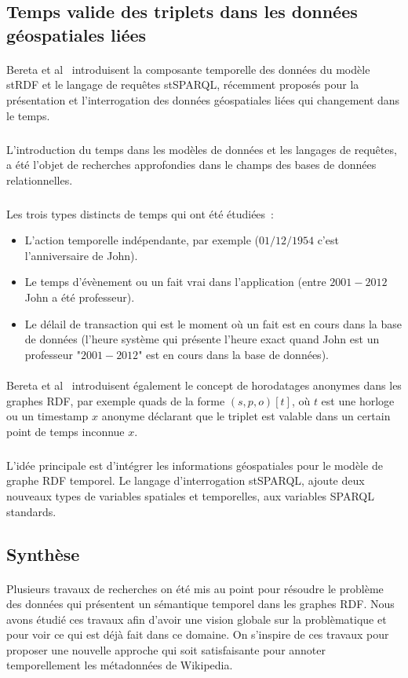 \documentclass[12pt,a4	]{report}
\begin{document}
\subsection*{Temps valide des triplets dans les données géospatiales liées}
\paragraph{}
Bereta et al~\cite{bereta2013} introduisent la composante temporelle des données du modèle stRDF et le langage de requêtes stSPARQL, récemment proposés pour la présentation et l’interrogation des données géospatiales liées qui changement dans le temps.
\subparagraph{}
L’introduction du temps dans les modèles de données et les langages de requêtes, a été l’objet de recherches approfondies dans le champs des bases de données relationnelles.
\subparagraph{}
Les trois types distincts de temps qui ont été  étudiées~:
\begin{itemize}
\item L'action temporelle indépendante, par exemple ($01/12/1954$ c’est l’anniversaire de John).
\item Le temps d’évènement ou un fait vrai dans l’application (entre $2001-2012$ John a été professeur).
\item Le délail de transaction qui est le moment où un fait est en cours dans la base de données (l’heure système qui présente l’heure exact quand John est un professeur "$2001-2012$" est en cours dans la base de données).
\end{itemize}
\paragraph{}
Bereta et al~\cite{bereta2013} introduisent également le concept de horodatages anonymes dans les graphes RDF, par exemple quads de la forme $(s, p, o)[t]$, où $t$ est une horloge ou un timestamp $x$ anonyme déclarant que le triplet est valable dans un certain point de temps inconnue $x$.
\subparagraph{}
L’idée principale est d’intégrer les informations géospatiales pour le modèle de graphe RDF temporel. Le langage d’interrogation stSPARQL, ajoute deux nouveaux types de variables spatiales et temporelles, aux variables SPARQL standards.
\subsection*{Synthèse}
\paragraph{}
Plusieurs travaux de recherches on été mis au point pour résoudre le problème des données qui présentent un sémantique temporel dans les graphes RDF. Nous avons étudié ces travaux afin d'avoir une vision globale sur la problèmatique et pour voir ce qui est déjà fait dans ce domaine. On s'inspire de ces travaux pour proposer une nouvelle approche qui soit satisfaisante pour annoter temporellement les métadonnées de Wikipedia.
\end{document}
